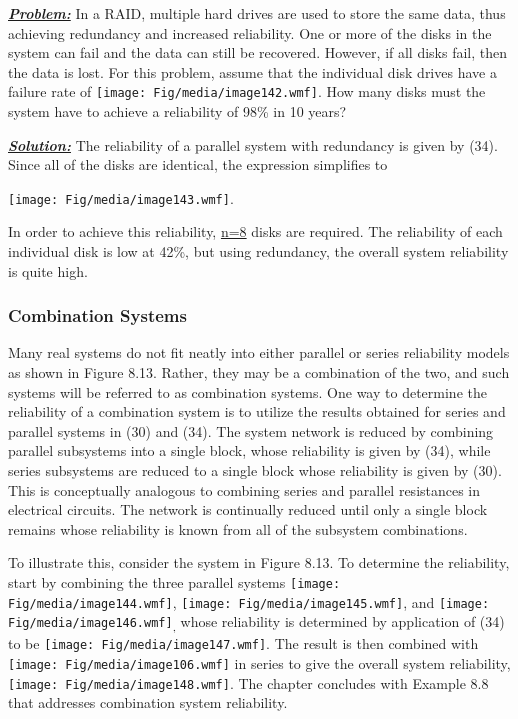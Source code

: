 \emph{\textbf{\ul{Problem:}}} In a RAID, multiple hard drives are used
to store the same data, thus achieving redundancy and increased
reliability. One or more of the disks in the system can fail and the
data can still be recovered. However, if all disks fail, then the data
is lost. For this problem, assume that the individual disk drives have a
failure rate of \texttt{[image: Fig/media/image142.wmf]}. How many disks
must the system have to achieve a reliability of 98\% in 10 years?

\emph{\textbf{\ul{Solution:}}} The reliability of a parallel system with
redundancy is given by (34). Since all of the disks are identical, the
expression simplifies to

\texttt{[image: Fig/media/image143.wmf]}.

In order to achieve this reliability, \ul{n=8} disks are required. The
reliability of each individual disk is low at 42\%, but using
redundancy, the overall system reliability is quite high.

\subsubsection{Combination Systems}\label{combination-systems}

Many real systems do not fit neatly into either parallel or series
reliability models as shown in Figure 8.13. Rather, they may be a
combination of the two, and such systems will be referred to as
combination systems. One way to determine the reliability of a
combination system is to utilize the results obtained for series and
parallel systems in (30) and (34). The system network is reduced by
combining parallel subsystems into a single block, whose reliability is
given by (34), while series subsystems are reduced to a single block
whose reliability is given by (30). This is conceptually analogous to
combining series and parallel resistances in electrical circuits. The
network is continually reduced until only a single block remains whose
reliability is known from all of the subsystem combinations.

To illustrate this, consider the system in Figure 8.13. To determine the
reliability, start by combining the three parallel systems
\texttt{[image: Fig/media/image144.wmf]},
\texttt{[image: Fig/media/image145.wmf]}, and
\texttt{[image: Fig/media/image146.wmf]}\textsubscript{,} whose
reliability is determined by application of (34) to be
\texttt{[image: Fig/media/image147.wmf]}. The result is then combined
with \texttt{[image: Fig/media/image106.wmf]} in series to give the
overall system reliability, \texttt{[image: Fig/media/image148.wmf]}.
The chapter concludes with Example 8.8 that addresses combination system
reliability.

